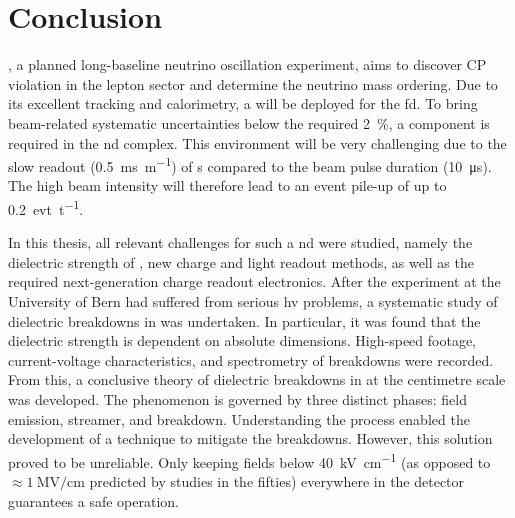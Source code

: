 \chapter{Conclusion}
\label{chap:conclusion}

\dune{}, a planned long-baseline neutrino oscillation experiment, aims to discover CP violation in the lepton sector and determine the neutrino mass ordering.
Due to its excellent tracking and calorimetry, a \lartpc{} will be deployed for the \gls{fd}.
To bring beam-related systematic uncertainties below the required \SI{2}{\percent}, a \lartpc{} component is required in the \gls{nd} complex.
This environment will be very challenging due to the slow readout (\SI{0.5}{\milli\second\per\metre}) of \lartpc{}s compared to the beam pulse duration (\SI{10}{\micro\second}).
The high beam intensity will therefore lead to an event pile-up of up to \SI{0.2}{evt\per\tonne_{\lar}}.

In this thesis, all relevant challenges for such a \gls{nd} \lartpc{} were studied, namely the dielectric strength of \lar{}, new charge and light readout methods, as well as the required next-generation charge readout electronics.
After the \AT{} experiment at the University of Bern had suffered from serious \gls{hv} problems, a systematic study of dielectric breakdowns in \lar{} was undertaken.
In particular, it was found that the dielectric strength is dependent on absolute dimensions.
High-speed footage, current-voltage characteristics, and spectrometry of breakdowns were recorded.
From this, a conclusive theory of dielectric breakdowns in \lar{} at the centimetre scale was developed.
The phenomenon is governed by three distinct phases: field emission, streamer, and breakdown.
Understanding the process enabled the development of a technique to mitigate the breakdowns.
However, this solution proved to be unreliable.
Only keeping fields below \SI{40}{\kilo\volt\per\centi\metre} (as opposed to $\approx \SI{1}{\mega\volt\per\centi\metre}$ predicted by studies in the fifties) everywhere in the detector guarantees a safe operation.

